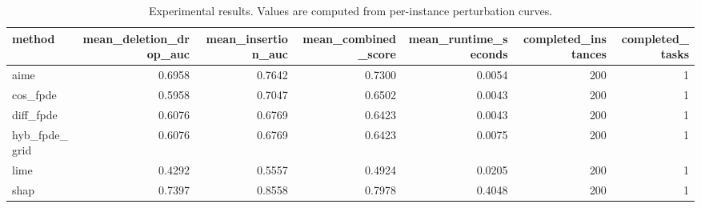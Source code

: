 \begin{table}[t]
\caption{Experimental results. Values are computed from per-instance perturbation curves.}
\label{tab:main_results_computed}
\centering
\begin{tabular}{lrrrrrr}
\toprule
method & mean\_deletion\_drop\_auc & mean\_insertion\_auc & mean\_combined\_score & mean\_runtime\_seconds & completed\_instances & completed\_tasks \\
\midrule
aime & 0.6958 & 0.7642 & 0.7300 & 0.0054 & 200 & 1 \\
cos\_fpde & 0.5958 & 0.7047 & 0.6502 & 0.0043 & 200 & 1 \\
diff\_fpde & 0.6076 & 0.6769 & 0.6423 & 0.0043 & 200 & 1 \\
hyb\_fpde\_grid & 0.6076 & 0.6769 & 0.6423 & 0.0075 & 200 & 1 \\
lime & 0.4292 & 0.5557 & 0.4924 & 0.0205 & 200 & 1 \\
shap & 0.7397 & 0.8558 & 0.7978 & 0.4048 & 200 & 1 \\
\bottomrule
\end{tabular}

\end{table}
